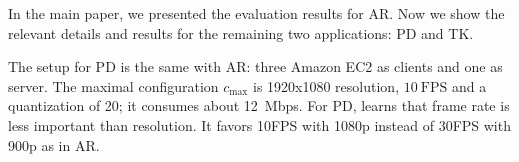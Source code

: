 \documentclass[twocolumn]{article}
\begin{document}


In the main paper, we presented the evaluation results for AR. Now we show the
relevant details and results for the remaining two applications: PD and TK.

 The setup for PD is the same with AR: three Amazon
EC2 as clients and one as server. The maximal configuration $c_{\max}$ is
1920x1080 resolution, \(10~\text{FPS}\) and a quantization of 20; it consumes
about \SI{12}{Mbps}. For PD, \sysname{} learns that frame rate is less important
than resolution. It favors 10FPS with 1080p instead of 30FPS with 900p as in AR.
\end{document}
